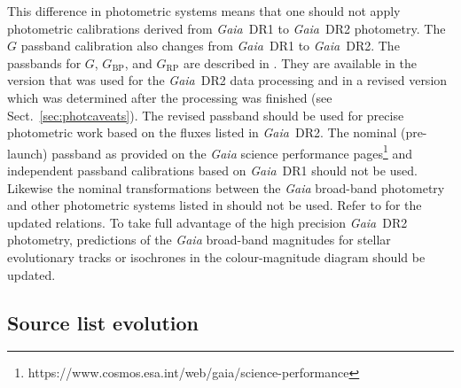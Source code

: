 \documentclass[longauth]{aa_gaia} %
\newcommand\gaia{\textit{Gaia}}
\newcommand\gdr[1]{\gaia~DR#1}
\newcommand\secref[1]{Sect.~\ref{#1}}
\newcommand\gbp{\ensuremath{G_\mathrm{BP}}}
\newcommand\grp{\ensuremath{G_\mathrm{RP}}}
\begin{document}
This difference in photometric systems means that one should not apply photometric calibrations
derived from \gdr{1} \cite[e.g., the calibration of the red-clump absolute $G$-band
magnitude,][]{2018A&A...609A.116R, 2017MNRAS.471..722H} to \gdr{2} photometry.  The $G$ passband
calibration also changes from \gdr{1} to \gdr{2}. The passbands for $G$, {\gbp}, and {\grp} are
described in \cite{DR2-DPACP-40}. They are available in the version that was used for the \gdr{2}
data processing and in a revised version which was determined after the processing was finished (see
\secref{sec:photcaveats}). The revised passband should be used for precise photometric work based on
the fluxes listed in \gdr{2}. The nominal (pre-launch) passband as provided on the {\gaia} science
performance pages\footnote{https://www.cosmos.esa.int/web/gaia/science-performance} and independent
passband calibrations based on \gdr{1} \citep{2018arXiv180201667W, 2017A&A...608L...8M} should not
be used.  Likewise the nominal transformations between the {\gaia} broad-band photometry and other
photometric systems listed in \cite{2010A&A...523A..48J} should not be used. Refer to
\cite{DR2-DPACP-40} for the updated relations. To take full advantage of the high precision \gdr{2}
photometry, predictions of the {\gaia} broad-band magnitudes for stellar evolutionary tracks or
isochrones in the colour-magnitude diagram \citep[e.g.][]{2016ApJ...823..102C, 2017ApJ...835...77M}
should be updated.

\subsection{Source list evolution}
\label{sec:sourcelist}
\end{document}
